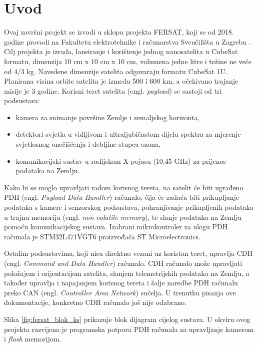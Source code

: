\chapter{Uvod}

Ovaj završni projekt se izvodi u sklopu projekta FERSAT, koji se od 2018. godine provodi na Fakultetu elektrotehnike i računarstva Sveučilišta u Zagrebu \cite{fersat_stranica_projekta}. Cilj projekta je izrada, lansiranje i korištenje jednog nanosatelita u CubeSat formatu, dimenzija 10 cm x 10 cm x 10 cm, volumena jedne litre i težine ne veće od 4/3 kg. Navedene dimenzije satelita odgovaraju formatu CubeSat 1U. Planirana visina orbite satelita je između 500 i 600 km, a očekivano trajanje misije je 3 godine. Korisni teret satelita (engl. \textit{payload}) se sastoji od tri podsustava:

\begin{itemize}
	\item kamera za snimanje površine Zemlje i zemaljskog horizonta,
	\item detektori svjetla u vidljivom i ultraljubičastom dijelu spektra za mjerenje svjetlosnog onečišćenja i debljine stupca ozona,
	\item komunikacijski sustav u radijskom X-pojasu (10.45 GHz) za prijenos podataka na Zemlju.
\end{itemize}

Kako bi se moglo upravljati radom korisnog tereta, na satelit će biti ugrađeno PDH (engl. \textit{Payload Data Handler}) računalo, čija će zadaća biti prikupljanje podataka s kamere i senzorskog podsustava, pohranjivanje prikupljenih podataka u trajnu memoriju (engl. \textit{non-volatile memory}), te slanje podataka na Zemlju pomoću komunikacijskog sustava. Izabrani mikrokontroler za ulogu PDH računala je STM32L471VGT6 proizvođača ST Microelectronics.

Ostalim podsustavima, koji nisu direktno vezani uz koristan teret, upravlja CDH (engl. \textit{Command and Data Handler}) računalo. CDH računalo može upravljati položajem i orijentacijom satelita, slanjem telemetrijskih podataka na Zemlju, a također upravlja i napajanjem korisnog tereta i šalje naredbe PDH računalu preko CAN (engl. \textit{Controller Area Network}) sučelja. U trenutku pisanja ove dokumentacije, konkretno CDH računalo još nije odabrano.
    
Slika \ref{fig:fersat_blok_ks} prikazuje blok dijagram cijelog sustava. U okviru ovog projekta razvijena je programska potpora PDH računala za upravljanje kamerom i \textit{flash} memorijom.

